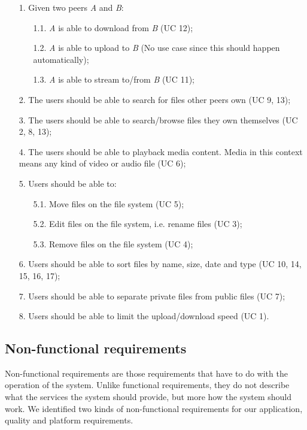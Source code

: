 \begin{itemize}
\item[1.] Given two peers \textit{A} and \textit{B}:
	\begin{itemize}
	\item[1.1.] \textit{A} is able to download from \textit{B} (UC 12);
	\item[1.2.] \textit{A} is able to upload to \textit{B} (No use case since this should happen automatically);
	\item[1.3.] \textit{A} is able to stream to/from \textit{B} (UC 11);
	\end{itemize}	
\item[2.] The users should be able to search for files other peers own (UC 9, 13);
\item[3.] The users should be able to search/browse files they own themselves (UC 2, 8, 13);
\item[4.] The users should be able to playback media content. Media in this context means any kind of video or audio file (UC 6);
\item[5.] Users should be able to:
	\begin{itemize}
	\item[5.1.] Move files on the file system (UC 5);
	\item[5.2.] Edit files on the file system, i.e. rename files (UC 3);	
	\item[5.3.] Remove files on the file system (UC 4);
	
	\end{itemize}	 
\item[6.] Users should be able to sort files by name, size, date and type (UC 10, 14, 15, 16, 17); 
\item[7.] Users should be able to separate private files from public files (UC 7);
\item[8.] Users should be able to limit the upload/download speed (UC 1). 
\end{itemize} 

\subsection{Non-functional requirements}
Non-functional requirements are those requirements that have to do with the operation of the system. Unlike functional requirements, they do not describe what the services the system should provide, but more how the system should work. We identified two kinds of non-functional requirements for our application, quality and platform requirements.

